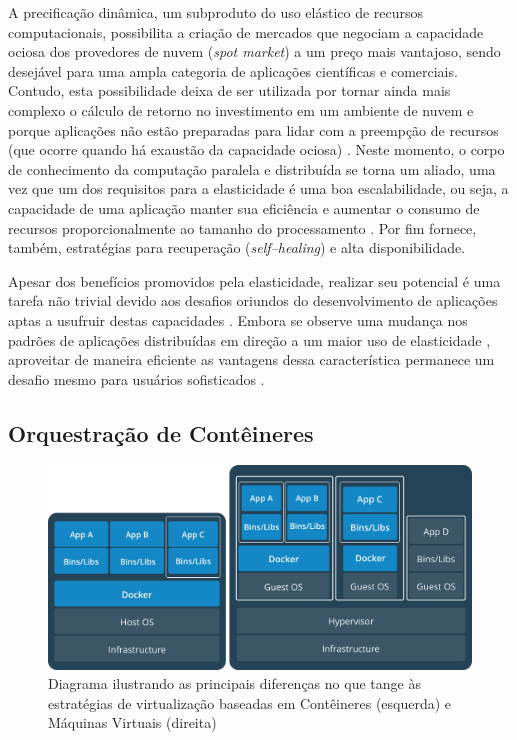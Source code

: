 \documentclass[english,brazilian]{UNISINOSmonografia} %
\newcommand\defaultFigureWidth{0.9}
\begin{document}
A precificação dinâmica, um subproduto do uso elástico de recursos computacionais, possibilita a criação de mercados que negociam a capacidade ociosa dos provedores de nuvem (\textit{spot market}) a um preço mais vantajoso, sendo desejável para uma ampla categoria de aplicações científicas e comerciais.
Contudo, esta possibilidade deixa de ser utilizada por tornar ainda mais complexo o cálculo de retorno no investimento em um ambiente de nuvem e porque aplicações não estão preparadas para lidar com a preempção de recursos (que ocorre quando há exaustão da capacidade ociosa) \cite{Jonas2017}.
Neste momento, o corpo de conhecimento da computação paralela e distribuída se torna um aliado, uma vez que um dos requisitos para a elasticidade é uma boa escalabilidade, ou seja, a capacidade de uma aplicação manter sua eficiência e aumentar o consumo de recursos proporcionalmente ao tamanho do processamento \cite{Galante2012,HennessyPatterson2013}.
Por fim fornece, também, estratégias para recuperação (\textit{self--healing}) e alta disponibilidade.


Apesar dos benefícios promovidos pela elasticidade, realizar seu potencial é uma tarefa não trivial devido aos desafios oriundos do desenvolvimento de aplicações aptas a usufruir destas capacidades \cite{Raveendran2011,Loff2014}.
Embora se observe uma mudança nos padrões de aplicações distribuídas em direção a um maior uso de elasticidade \cite{Shankar2018}, aproveitar de maneira eficiente as vantagens dessa característica permanece um desafio mesmo para usuários sofisticados \cite{Jonas2017}.


\subsection{Orquestração de Contêineres}


\begin{figure}[tb]
	\centering%
	\begin{minipage}{\defaultFigureWidth\textwidth}
		\caption[Diagrama ilustrando as principais diferenças no que tange às estratégias de virtualização baseadas em Contêineres e Máquinas Virtuais]{Diagrama ilustrando as principais diferenças no que tange às estratégias de virtualização baseadas em Contêineres (esquerda) e Máquinas Virtuais (direita)}
		\label{fig:docker}
		\vspace{1ex}
		\includegraphics[clip,width=\textwidth]{docker-concept}
	\end{minipage}
\end{figure}
\end{document}
